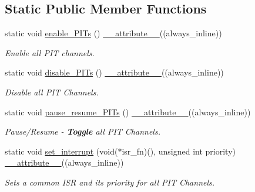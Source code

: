 \subsection*{Static Public Member Functions}
\begin{DoxyCompactItemize}
\item 
static void \hyperlink{group__PIT__Glb_gaa742977692efbc075b52a5dbd6533230}{enable\+\_\+\+P\+I\+Ts} () \hyperlink{utilities_8hpp_a103d5b3998e0dd804213c8f30a094f4d}{\+\_\+\+\_\+attribute\+\_\+\+\_\+}((always\+\_\+inline))
\begin{DoxyCompactList}\small\item\em Enable all P\+IT channels. \end{DoxyCompactList}\item 
static void \hyperlink{group__PIT__Glb_ga5e1bf9f8053a51c68f0ff2178ab56954}{disable\+\_\+\+P\+I\+Ts} () \hyperlink{utilities_8hpp_a103d5b3998e0dd804213c8f30a094f4d}{\+\_\+\+\_\+attribute\+\_\+\+\_\+}((always\+\_\+inline))
\begin{DoxyCompactList}\small\item\em Disable all P\+IT Channels. \end{DoxyCompactList}\item 
static void \hyperlink{group__PIT__Glb_ga24b7ea02555967ef945ab87aae338574}{pause\+\_\+resume\+\_\+\+P\+I\+Ts} () \hyperlink{utilities_8hpp_a103d5b3998e0dd804213c8f30a094f4d}{\+\_\+\+\_\+attribute\+\_\+\+\_\+}((always\+\_\+inline))
\begin{DoxyCompactList}\small\item\em Pause/\+Resume -\/ {\bfseries Toggle} all P\+IT Channels. \end{DoxyCompactList}\item 
static void \hyperlink{group__Interrupt_gaa94b6dc081d453c8dda54c3ade4b3d94}{set\+\_\+interrupt} (void($\ast$isr\+\_\+fn)(), unsigned int priority) \hyperlink{utilities_8hpp_a103d5b3998e0dd804213c8f30a094f4d}{\+\_\+\+\_\+attribute\+\_\+\+\_\+}((always\+\_\+inline))
\begin{DoxyCompactList}\small\item\em Sets a common I\+SR and its priority for all P\+IT Channels. \end{DoxyCompactList}\end{DoxyCompactItemize}

